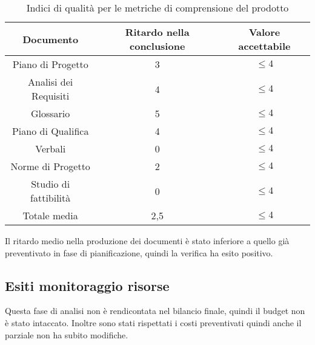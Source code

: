 \documentclass[../piano_di_qualifica.tex]{subfiles}
\begin{document}
\begin{table}[!ht]
\centering
\begin{tabular}{|c|c|c|}
		\hline
		\rowcolor{lightgray}
		\textbf{Documento} & \textbf{Ritardo nella conclusione} & \textbf{Valore accettabile} \\
		\hline 
		Piano di Progetto & 3  & \(\leq 4\) \\
 		\hline
		Analisi dei Requisiti & 4 &\(\leq 4\)\\
		\hline
		Glossario & 5 & \(\leq 4\) \\
		\hline
		Piano di Qualifica & 4 & \(\leq 4\) \\
		\hline
		Verbali & 0 & \(\leq 4\) \\
		\hline
		Norme di Progetto & 2 & \(\leq 4\) \\
		\hline
		Studio di fattibilità & 0 & \(\leq 4\)\\
		\hline
		Totale media & 2,5 & \(\leq 4\) \\
		\hline
\end{tabular}
\caption{Indici di qualità per le metriche di comprensione del prodotto}
\end{table}

Il ritardo medio nella produzione dei documenti è stato inferiore a quello già preventivato in fase di pianificazione, quindi la verifica ha esito positivo.

\subsection{Esiti monitoraggio risorse}
\label{sub:verif_monit}
Questa fase di analisi non è rendicontata nel bilancio finale, quindi il budget non è stato intaccato. Inoltre sono stati rispettati i costi preventivati quindi anche il parziale non ha subito modifiche.
\end{document}

